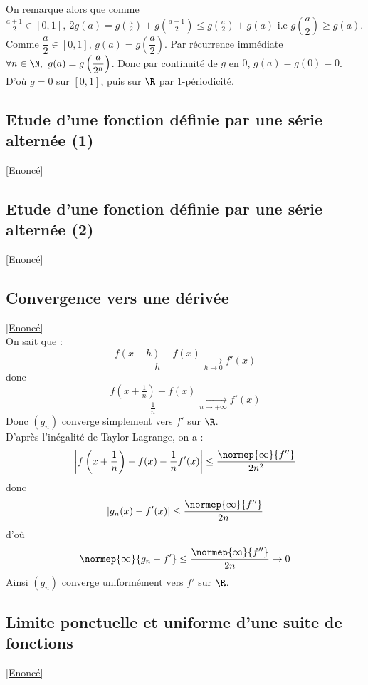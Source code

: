 \documentclass{book}
\begin{document}
\begin{enumerate}[leftmargin=*]
		On remarque alors que comme $\displaystyle\frac{a+1}{2}\in [0,1],\ 2g(a)=g\left(\frac{a}{2}\right)+g\left(\frac{a+1}{2}\right)\leq g\left(\frac{a}{2}\right)+g(a)$ i.e $g\left(\dfrac{a}{2}\right)\geq g(a)$. Comme $\dfrac{a}{2}\in [0,1]$, $g(a)=g\left(\dfrac{a}{2}\right)$. Par récurrence immédiate $\forall n\in \N,\ g(a)=g\left(\dfrac{a}{2^n}\right)$. Donc par continuité de $g$ en $0$, $g(a)=g(0)=0$. D'où $g=0$ sur $[0,1]$, puis sur $\R$ par $1$-périodicité.
	\end{enumerate}
	
	\subsection{Etude d'une fonction définie par une série alternée (1)}
	\label{sec:etude-dune-fonction-definie-par-une-serie-alternee-1}
	\textcolor{blue}{\hyperref[Etude d'une fonction définie par une série alternée 1]{[Enoncé]}}\\
		
	\subsection{Etude d'une fonction définie par une série alternée (2)}
	\label{sec:etude-dune-fonction-definie-par-une-serie-alternee-2}
	\textcolor{blue}{\hyperref[Etude d'une fonction définie par une série alternée 2]{[Enoncé]}}\\
	
	\subsection{Convergence vers une dérivée}
	\label{sec:convergence-vers-une-derivee}
	\textcolor{blue}{\hyperref[Convergence vers une dérivée]{[Enoncé]}}\\
		On sait que : \[\frac{f(x+h)-f(x)}{h}\underset{h\to 0}{\to}f'(x)\]
		donc \[\frac{f\left(x+\frac{1}{n}\right)-f(x)}{\frac{1}{n}}\underset{n\to +\infty}{\to}f'(x)\]
		Donc $(g_n)$ converge simplement vers $f'$ sur $\R$.\\
		D'après l'inégalité de Taylor Lagrange, on a : 
		\[\left|f\left(x+\frac{1}{n}\right)-f(x)-\frac{1}{n}f'(x)\right|\leq\frac{\normep{\infty}{f''}}{2n^2}\]
		donc \[|g_n(x)-f'(x)|\leq\frac{\normep{\infty}{f''}}{2n}\]
		d'où \[\normep{\infty}{g_n-f'}\leq \frac{\normep{\infty}{f''}}{2n}\to 0\]
		Ainsi $(g_n)$ converge uniformément vers $f'$ sur $\R$.
	
	\subsection{Limite ponctuelle et uniforme d'une suite de fonctions}
	\label{sec:limite-ponctuelle-et-uniforme-dune-suite-de-fonctions}
	\textcolor{blue}{\hyperref[Limite ponctuelle et uniforme d'une suite de fonctions]{[Enoncé]}}\\
	
\end{document}
